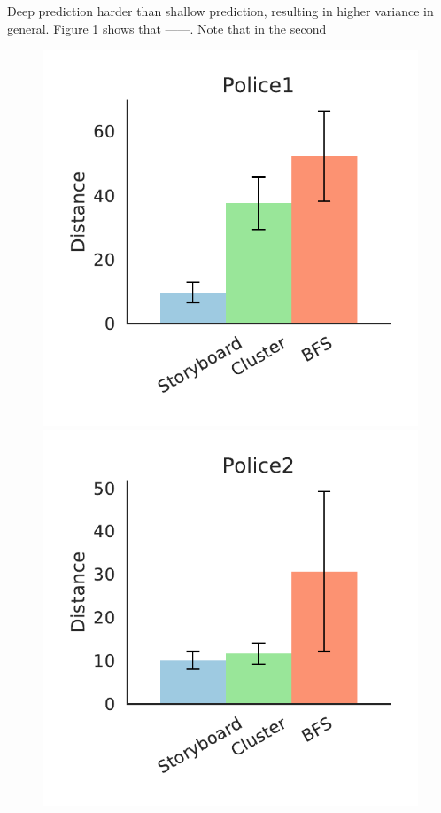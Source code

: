 Deep prediction harder than shallow prediction, resulting in higher variance in general.
Figure \ref{distance} shows that \system ------. 
Note that in the second 
\begin{figure}[bht]
\label{distance}
\centering
\includegraphics[scale=0.4]{figures/Police1.pdf}
\includegraphics[scale=0.4]{figures/Police2.pdf}

\end{figure}
